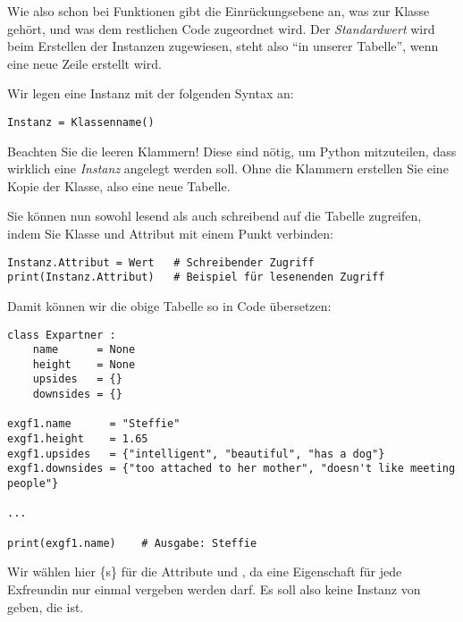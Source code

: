 Wie also schon bei Funktionen gibt die Einrückungsebene an, was zur Klasse gehört, und was dem restlichen Code zugeordnet wird. Der \emph{Standardwert} wird beim Erstellen der Instanzen zugewiesen, steht also \enquote{in unserer Tabelle}, wenn eine neue Zeile erstellt wird.

Wir legen eine Instanz mit der folgenden Syntax an:
\begin{codebox}
\begin{verbatim}
Instanz = Klassenname()
\end{verbatim}
\end{codebox}

Beachten Sie die leeren Klammern! Diese sind nötig, um Python mitzuteilen, dass wirklich eine \emph{Instanz} angelegt werden soll. Ohne die Klammern erstellen Sie eine Kopie der Klasse, also eine neue Tabelle.

Sie können nun sowohl lesend als auch schreibend auf die Tabelle zugreifen, indem Sie Klasse und Attribut mit einem Punkt verbinden:
\begin{codebox}
\begin{verbatim}
Instanz.Attribut = Wert   # Schreibender Zugriff
print(Instanz.Attribut)   # Beispiel für lesenenden Zugriff
\end{verbatim}
\end{codebox}

Damit können wir die obige Tabelle so in Code übersetzen:
\begin{codebox}
\begin{verbatim}
class Expartner :
    name      = None
    height    = None
    upsides   = {}
    downsides = {}

exgf1.name      = "Steffie"
exgf1.height    = 1.65
exgf1.upsides   = {"intelligent", "beautiful", "has a dog"}
exgf1.downsides = {"too attached to her mother", "doesn't like meeting people"}

...

print(exgf1.name)    # Ausgabe: Steffie
\end{verbatim}
\end{codebox}

Wir wählen hier \{s\} für die Attribute  und , da eine Eigenschaft für jede Exfreundin nur einmal vergeben werden darf. Es soll also keine Instanz von  geben, die  ist.

